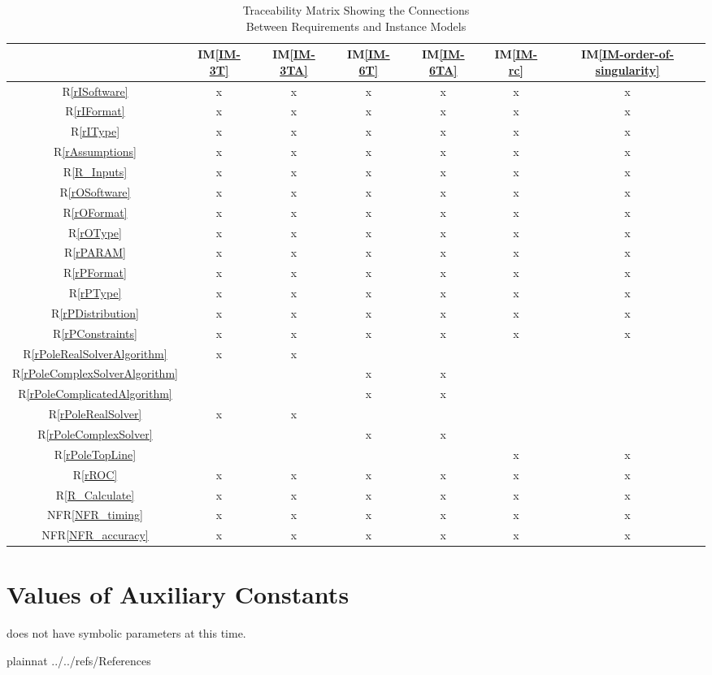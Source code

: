 \documentclass[12pt]{article}
\newcommand{\iref}[1]{IM\ref{#1}}
\newcommand{\rref}[1]{R\ref{#1}}
\newcommand{\nfrref}[1]{NFR\ref{#1}}
\begin{document}
\begin{table}[h!]
\centering
\begin{tabular}{|c|c|c|c|c|c|c|}
\hline
	& \iref{IM-3T}
	& \iref{IM-3TA}
	& \iref{IM-6T}
	& \iref{IM-6TA}
	& \iref{IM-rc}
  & \iref{IM-order-of-singularity}
  \\
\hline
\rref{rISoftware}                  &x&x&x&x&x&x\\ \hline
\rref{rIFormat}                    &x&x&x&x&x&x\\ \hline
\rref{rIType}                      &x&x&x&x&x&x\\ \hline
\rref{rAssumptions}                &x&x&x&x&x&x\\ \hline
\rref{R_Inputs}                    &x&x&x&x&x&x\\ \hline
\rref{rOSoftware}                  &x&x&x&x&x&x\\ \hline
\rref{rOFormat}                    &x&x&x&x&x&x\\ \hline
\rref{rOType}                      &x&x&x&x&x&x\\ \hline
\rref{rPARAM}                      &x&x&x&x&x&x\\ \hline
\rref{rPFormat}                    &x&x&x&x&x&x\\ \hline
\rref{rPType}                      &x&x&x&x&x&x\\ \hline
\rref{rPDistribution}              &x&x&x&x&x&x\\ \hline
\rref{rPConstraints}               &x&x&x&x&x&x\\ \hline
\rref{rPoleRealSolverAlgorithm}    &x&x& & & & \\ \hline
\rref{rPoleComplexSolverAlgorithm} & & &x&x& & \\ \hline
\rref{rPoleComplicatedAlgorithm}   & & &x&x& & \\ \hline
\rref{rPoleRealSolver}             &x&x& & & & \\ \hline
\rref{rPoleComplexSolver}          & & &x&x& & \\ \hline
\rref{rPoleTopLine}                & & & & &x&x\\ \hline
\rref{rROC}                        &x&x&x&x&x&x\\ \hline
\rref{R_Calculate}                 &x&x&x&x&x&x\\ \hline
\nfrref{NFR_timing}                &x&x&x&x&x&x\\ \hline
\nfrref{NFR_accuracy}              &x&x&x&x&x&x\\ \hline
  \hline
\end{tabular}
\caption{Traceability Matrix Showing the Connections\\Between Requirements and Instance Models}
\label{Table:R_trace}
\end{table}

\section{Values of Auxiliary Constants}

 does not have symbolic parameters at this time.

\newpage

 {plainnat}
 {../../refs/References}
\end{document}
